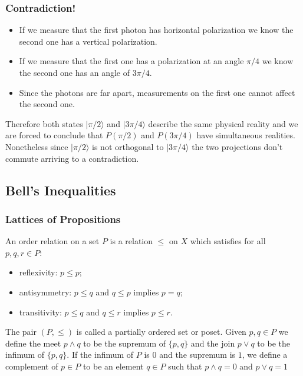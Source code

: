 \documentclass{beamer}
\theoremstyle{definition}
\begin{document}
\begin{frame}

\frametitle{Contradiction!}

\begin{itemize}

\item If we measure that the first photon has horizontal polarization we know the second one has a vertical polarization.
\item If we measure that the first one has a polarization at an angle $\pi/4$ we know the second one has an angle of $3\pi/4$. 
\item Since the photons are far apart, measurements on the first one cannot affect the second one.

\end{itemize}

Therefore both states $|\pi/2\rangle$ and $|3\pi/4\rangle$ describe the same physical reality and we are forced to conclude that $P(\pi/2)$ and $P(3\pi/4)$ have simultaneous realities. Nonetheless since $|\pi/2\rangle$ is not orthogonal to $|3\pi/4\rangle$ the two projections don't commute arriving to a contradiction.

\end{frame}

\subsection{Bell's Inequalities}

\begin{frame}

\frametitle{Lattices of Propositions}

\begin{definition}
An order relation on a set $P$ is a relation $\leq$ on $X$ which satisfies for all $p,q,r\in P$:
\begin{itemize}
\item reflexivity: $p\leq p$;
\item antisymmetry: $p\leq q$ and $q\leq p$ implies $p=q$;
\item transitivity: $p\leq q$ and $q\leq r$ implies $p\leq r$.
\end{itemize}
The pair $(P,\leq)$ is called a partially ordered set or poset. Given $p,q\in P$ we define the meet $p\wedge q$ to be the supremum of $\{p,q\}$ and the join $p\vee q$ to be the infimum of $\{p,q\}$. If the infimum of $P$ is $0$ and the supremum is $1$, we define a complement of $p\in P$ to be an element $q\in P$ such that $p\wedge q = 0$ and $p\vee q=1$ 
\end{definition}

\end{frame}
\end{document}
